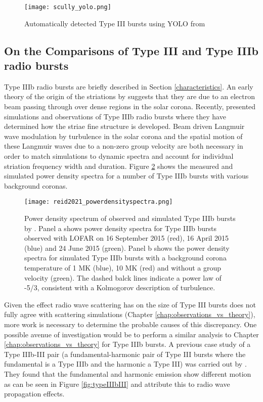 \begin{figure}[ht]
\centering
\texttt{[image: scully\_yolo.png]}
\caption[Automatically detected Type III bursts using YOLO]{Automatically detected Type III bursts using YOLO from \cite{Scully2021}}
\label{fig:yolo}
\end{figure}

\subsection{On the Comparisons of Type III and Type IIIb radio bursts}
Type IIIb radio bursts are briefly described in Section \ref{characteristics}. An early theory of the origin of the striations by \cite{Takakura1975} suggests that they are due to an electron beam passing through over dense regions in the solar corona. Recently, \cite{Reid2021} presented simulations and observations of Type IIIb radio bursts where they have determined how the striae fine structure is developed. Beam driven Langmuir wave modulation by turbulence in the solar corona and the spatial motion of these Langmuir waves due to a non-zero group velocity are both necessary in order to match simulations to dynamic spectra and account for individual striation frequency width and duration. Figure \ref{fig:reid_pds} shows the measured and simulated power density spectra for a number of Type IIIb bursts with various background coronas.

\begin{figure}[ht]
\centering
\texttt{[image: reid2021\_powerdensityspectra.png]}
\caption[Power density spectrum of observed and simulated Type IIIb bursts by \cite{Reid2021}]{Power density spectrum of observed and simulated Type IIIb bursts by \cite{Reid2021}. Panel a shows power density spectra for Type IIIb bursts observed with LOFAR on 16 September 2015 (red), 16 April 2015 (blue) and 24 June 2015 (green). Panel b shows the power density spectra for simulated Type IIIb bursts with a background corona temperature of 1 MK (blue), 10 MK (red) and without a group velocity (green). The dashed balck lines indicate a power law of -5/3, consistent with a Kolmogorov description of turbulence.}
\label{fig:reid_pds}
\end{figure}

Given the effect radio wave scattering has on the size of Type III bursts does not fully agree with scattering simulations (Chapter \ref{chap:observations_vs_theory}), more work is necessary to determine the probable causes of this discrepancy. One possible avenue of investigation would be to perform a similar analysis to Chapter \ref{chap:observations_vs_theory} for Type IIIb bursts. A previous case study of a Type IIIb-III pair (a fundamental-harmonic pair of Type III bursts where the fundamental is a Type IIIb and the harmonic a Type III) was carried out by \cite{Zhang2020}. They found that the fundamental and harmonic emission show different motion as can be seen in Figure \ref{fig:typeIIIbIII} and attribute this to radio wave propagation effects.

